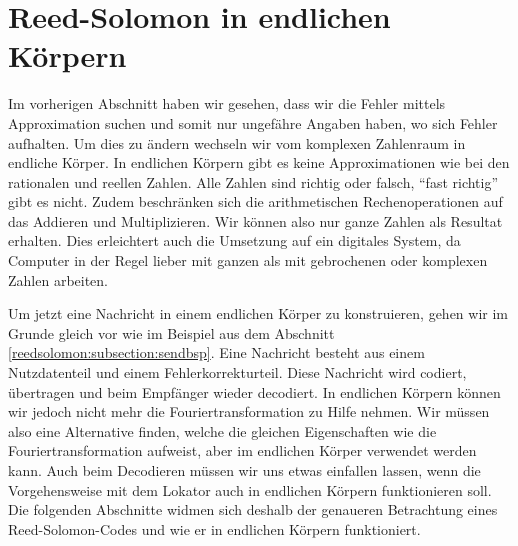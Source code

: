 %
%
%
\section{Reed-Solomon in endlichen Körpern
\label{reedsolomon:section:endlichekoerper}}
Im vorherigen Abschnitt haben wir gesehen, dass wir die Fehler mittels Approximation suchen und somit nur ungefähre Angaben haben, wo sich Fehler aufhalten. 
Um dies zu ändern wechseln wir vom komplexen Zahlenraum in endliche Körper.
In endlichen Körpern gibt es keine Approximationen wie bei den rationalen und reellen Zahlen. 
Alle Zahlen sind richtig oder falsch, ``fast richtig'' gibt es nicht.
Zudem beschränken sich die arithmetischen Rechenoperationen auf das Addieren und Multiplizieren. 
Wir können also nur ganze Zahlen als Resultat erhalten.
Dies erleichtert auch die Umsetzung auf ein digitales System, da Computer in der Regel lieber mit ganzen als mit gebrochenen oder komplexen Zahlen arbeiten. 

Um jetzt eine Nachricht in einem endlichen Körper zu konstruieren, gehen wir im Grunde gleich vor wie im Beispiel aus dem Abschnitt \ref{reedsolomon:subsection:sendbsp}.
Eine Nachricht besteht aus einem Nutzdatenteil und einem Fehlerkorrekturteil. 
Diese Nachricht wird codiert, übertragen und beim Empfänger wieder decodiert. 
In endlichen Körpern können wir jedoch nicht mehr die Fouriertransformation zu Hilfe nehmen.
Wir müssen also eine Alternative finden, welche die gleichen Eigenschaften wie die Fouriertransformation aufweist, aber im endlichen Körper verwendet werden kann.
Auch beim Decodieren müssen wir uns etwas einfallen lassen, wenn die Vorgehensweise mit dem Lokator auch in endlichen Körpern funktionieren soll. Die folgenden Abschnitte widmen sich deshalb der genaueren Betrachtung eines Reed-Solomon-Codes und wie er in endlichen Körpern funktioniert. 

